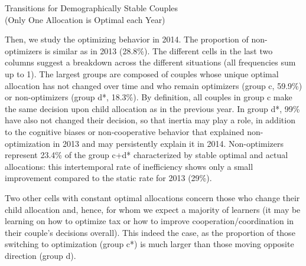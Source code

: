   \begin{table}[H]
  \caption{Transitions for Demographically Stable Couples\\ 
(Only One Allocation is Optimal each Year)
}
  \label{tab:table_4}
  \end{table}

Then, we study the optimizing behavior in 2014. The proportion of non-optimizers is similar as in 2013 (28.8\%). The different cells in the last two columns suggest a breakdown across the different situations (all frequencies sum up to 1). The largest groups are composed of couples whose unique optimal allocation has not changed over time and who remain optimizers (group c, 59.9\%) or non-optimizers (group d*, 18.3\%). By definition, all couples in group c make the same decision upon child allocation as in the previous year. In group d*, 99\% have also not changed their decision, so that inertia may play a role, in addition to the cognitive biases or non-cooperative behavior that explained non-optimization in 2013 and may persistently explain it in 2014. Non-optimizers represent 23.4\% of the group c+d* characterized by stable optimal and actual allocations: this intertemporal rate of inefficiency shows only a small improvement compared to the static rate for 2013 (29\%). 


\medskip
Two other cells with constant optimal allocations concern those who change their child allocation and, hence, for whom we expect a majority of learners (it may be learning on how to optimize tax or how to improve cooperation/coordination in their couple’s decisions overall). This indeed the case, as the proportion of those switching to optimization (group c*) is much larger than those moving opposite direction (group d). 


